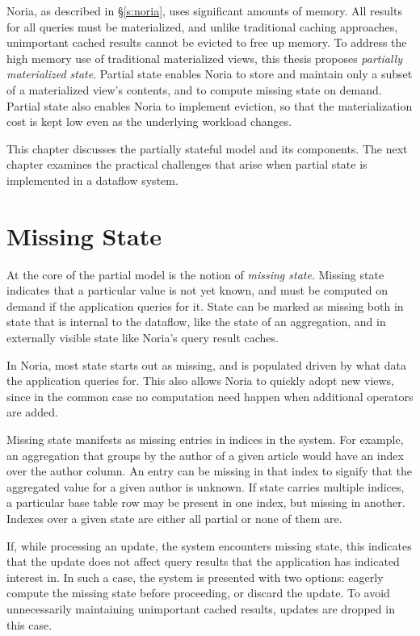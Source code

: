 Noria, as described in \S\ref{s:noria}, uses significant amounts of memory. All
results for all queries must be materialized, and unlike traditional caching
approaches, unimportant cached results cannot be evicted to free up memory. To
address the high memory use of traditional materialized views, this thesis
proposes \textit{partially materialized state}. Partial state enables Noria to
store and maintain only a subset of a materialized view's contents, and to
compute missing state on demand. Partial state also enables Noria to implement
eviction, so that the materialization cost is kept low even as the underlying
workload changes.

This chapter discusses the partially stateful model and its components. The next
chapter examines the practical challenges that arise when partial state is
implemented in a dataflow system.

\section{Missing State}

At the core of the partial model is the notion of \textit{missing state}.
Missing state indicates that a particular value is not yet known, and must be
computed on demand if the application queries for it. State can be marked as
missing both in state that is internal to the dataflow, like the state of an
aggregation, and in externally visible state like Noria's query result caches.

In Noria, most state starts out as missing, and is populated driven by what data
the application queries for. This also allows Noria to quickly adopt new views,
since in the common case no computation need happen when additional operators
are added.

Missing state manifests as missing entries in indices in the system. For
example, an aggregation that groups by the author of a given article would have
an index over the author column. An entry can be missing in that index to
signify that the aggregated value for a given author is unknown. If state
carries multiple indices, a particular base table row may be present in one
index, but missing in another. Indexes over a given state are either all partial
or none of them are.

If, while processing an update, the system encounters missing state, this
indicates that the update does not affect query results that the application has
indicated interest in. In such a case, the system is presented with two options:
eagerly compute the missing state before proceeding, or discard the update. To
avoid unnecessarily maintaining unimportant cached results, updates are dropped
in this case.


